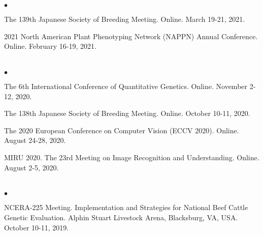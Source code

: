 \documentclass[margin,line,10pt]{res}
\newenvironment{list2}{
  \begin{list}{$\bullet$}{%
      \setlength{\itemsep}{0in}
      \setlength{\parsep}{0in} \setlength{\parskip}{0in}
      \setlength{\topsep}{0in} \setlength{\partopsep}{0in} 
      \setlength{\leftmargin}{0.2in}}}{\end{list}}
\begin{document}
\begin{resume}
\begin{list2}
  \vspace{0.5cm}
  
\item The 139th Japanese Society of Breeding Meeting. Online. March 19-21, 2021.

    \vspace{0.5cm}

  \item 2021 North American Plant Phenotyping Network (NAPPN) Annual Conference. Online. February 16-19, 2021.  
  
\end{list2}

  
\section{}
\begin{list2}


\item  The 6th International Conference of Quantitative Genetics. Online. November 2-12, 2020. 

  \vspace{0.5cm}

  
  \item The 138th Japanese Society of Breeding Meeting. Online. October 10-11, 2020. 

    \vspace{0.5cm}
    
\item The 2020 European Conference on Computer Vision (ECCV 2020). Online. August 24-28, 2020.  

      \vspace{0.5cm}

\item MIRU 2020. The 23rd Meeting on Image Recognition and Understanding. Online. August 2-5, 2020. 

\end{list2}



\section{}
\begin{list2}

\item NCERA-225 Meeting. Implementation and Strategies for National Beef Cattle Genetic Evaluation. Alphin Stuart Livestock Arena, Blacksburg, VA, USA. October 10-11, 2019.


\end{list2}
\end{resume}
\end{document}
